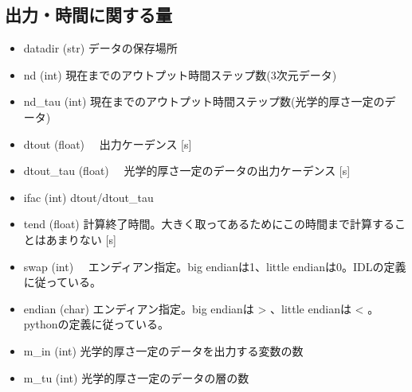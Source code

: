 \documentclass[letterpaper,10pt,dvipdfmx,report]{sphinxmanual}
\begin{document}
\subsection{出力・時間に関する量}
\label{\detokenize{notation:id1}}\begin{itemize}
\item {} 
\sphinxAtStartPar
datadir (str) \sphinxhyphen{}\sphinxhyphen{} データの保存場所

\item {} 
\sphinxAtStartPar
nd (int) \sphinxhyphen{}\sphinxhyphen{} 現在までのアウトプット時間ステップ数(3次元データ)

\item {} 
\sphinxAtStartPar
nd\_tau (int) \sphinxhyphen{}\sphinxhyphen{} 現在までのアウトプット時間ステップ数(光学的厚さ一定のデータ)

\item {} 
\sphinxAtStartPar
dtout (float) \sphinxhyphen{}\sphinxhyphen{}　出力ケーデンス {[}s{]}

\item {} 
\sphinxAtStartPar
dtout\_tau (float) \sphinxhyphen{}\sphinxhyphen{}　光学的厚さ一定のデータの出力ケーデンス {[}s{]}

\item {} 
\sphinxAtStartPar
ifac (int) \sphinxhyphen{}\sphinxhyphen{} dtout/dtout\_tau

\item {} 
\sphinxAtStartPar
tend (float) \sphinxhyphen{}\sphinxhyphen{} 計算終了時間。大きく取ってあるためにこの時間まで計算することはあまりない {[}s{]}

\item {} 
\sphinxAtStartPar
swap (int) \sphinxhyphen{}\sphinxhyphen{}　エンディアン指定。big endianは1、little endianは0。IDLの定義に従っている。

\item {} 
\sphinxAtStartPar
endian (char) \sphinxhyphen{}\sphinxhyphen{} エンディアン指定。big endianは \textgreater{} 、little endianは \textless{} 。pythonの定義に従っている。

\item {} 
\sphinxAtStartPar
m\_in (int) \sphinxhyphen{}\sphinxhyphen{} 光学的厚さ一定のデータを出力する変数の数

\item {} 
\sphinxAtStartPar
m\_tu (int) \sphinxhyphen{}\sphinxhyphen{} 光学的厚さ一定のデータの層の数

\end{itemize}
\end{document}
